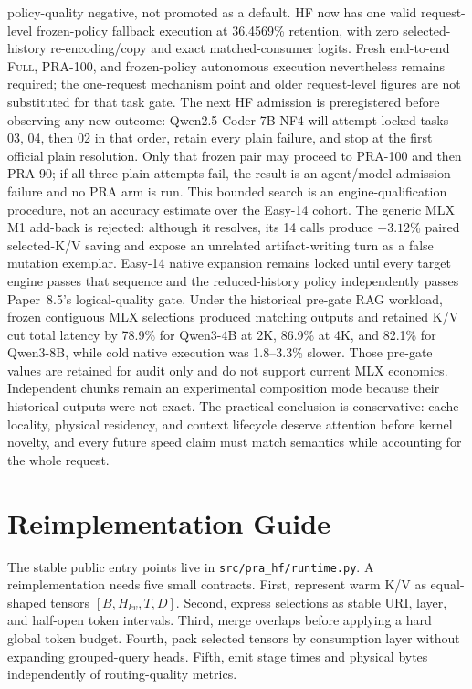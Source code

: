 \documentclass[11pt]{article}
\begin{document}
policy-quality negative, not promoted as a default.  HF now has one valid
request-level frozen-policy fallback execution at 36.4569\% retention, with
zero selected-history re-encoding/copy and exact matched-consumer logits.
Fresh end-to-end \textsc{Full}, PRA-100, and frozen-policy autonomous execution
nevertheless remains required; the one-request mechanism point and older
request-level figures are not substituted for that task gate.
The next HF admission is preregistered before observing any new outcome:
Qwen2.5-Coder-7B NF4 will attempt locked tasks 03, 04, then 02 in that order,
retain every plain failure, and stop at the first official plain resolution.
Only that frozen pair may proceed to PRA-100 and then PRA-90; if all three
plain attempts fail, the result is an agent/model admission failure and no PRA
arm is run.  This bounded search is an engine-qualification procedure, not an
accuracy estimate over the Easy-14 cohort.
The generic MLX M1 add-back is rejected: although it resolves, its 14 calls
produce $-3.12$\% paired selected-K/V saving and expose an unrelated
artifact-writing turn as a false mutation exemplar.
Easy-14
native expansion remains locked until every target engine passes that sequence
and the reduced-history policy independently passes Paper~8.5's logical-quality
gate.  Under the
historical pre-gate RAG workload, frozen contiguous MLX selections produced
matching outputs and retained K/V cut total latency by 78.9\% for Qwen3-4B at
2K, 86.9\% at 4K, and
82.1\% for Qwen3-8B, while cold native execution was 1.8--3.3\% slower. Those
pre-gate values are retained for audit only and do not support current MLX
economics. Independent chunks remain an experimental composition mode because
their historical outputs were not exact.
The practical
conclusion is conservative: cache locality, physical residency, and context
lifecycle deserve attention before kernel novelty, and every future speed
claim must match semantics while accounting for the whole request.

\section{Reimplementation Guide}

The stable public entry points live in \texttt{src/pra\_hf/runtime.py}.  A
reimplementation needs five small contracts.  First, represent warm K/V as
equal-shaped tensors $[B,H_{kv},T,D]$.  Second, express selections as stable URI,
layer, and half-open token intervals.  Third, merge overlaps before applying a
hard global token budget.  Fourth, pack selected tensors by consumption layer
without expanding grouped-query heads.  Fifth, emit stage times and physical
bytes independently of routing-quality metrics.
\end{document}
